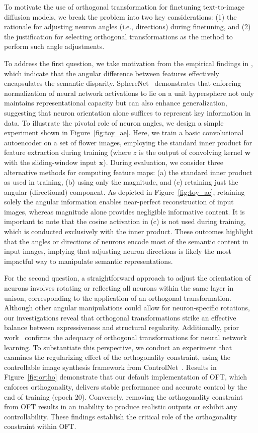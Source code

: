 To motivate the use of orthogonal transformation for finetuning text-to-image diffusion models, we break the problem into two key considerations: (1) the rationale for adjusting neuron angles (i.e., directions) during finetuning, and (2) the justification for selecting orthogonal transformations as the method to perform such angle adjustments.

To address the first question, we take motivation from the empirical findings in \cite{liu2018decoupled,chen2020angular}, which indicate that the angular difference between features effectively encapsulates the semantic disparity. SphereNet~\cite{liu2017deep} demonstrates that enforcing normalization of neural network activations to lie on a unit hypersphere not only maintains representational capacity but can also enhance generalization, suggesting that neuron orientation alone suffices to represent key information in data. To illustrate the pivotal role of neuron angles, we design a simple experiment shown in Figure~\ref{fig:toy_ae}. Here, we train a basic convolutional autoencoder on a set of flower images, employing the standard inner product for feature extraction during training (where $z$ is the output of convolving kernel $\bm{w}$ with the sliding-window input $\bm{x}$). During evaluation, we consider three alternative methods for computing feature maps: (a) the standard inner product as used in training, (b) using only the magnitude, and (c) retaining just the angular (directional) component. As depicted in Figure~\ref{fig:toy_ae}, retaining solely the angular information enables near-perfect reconstruction of input images, whereas magnitude alone provides negligible informative content. It is important to note that the cosine activation in (c) is not used during training, which is conducted exclusively with the inner product. These outcomes highlight that the angles or directions of neurons encode most of the semantic content in input images, implying that adjusting neuron directions is likely the most impactful way to manipulate semantic representations.

For the second question, a straightforward approach to adjust the orientation of neurons involves rotating or reflecting all neurons within the same layer in unison, corresponding to the application of an orthogonal transformation. Although other angular manipulations could allow for neuron-specific rotations, our investigations reveal that orthogonal transformations strike an effective balance between expressiveness and structural regularity. Additionally, prior work~\cite{liu2021orthogonal} confirms the adequacy of orthogonal transformations for neural network learning. To substantiate this perspective, we conduct an experiment that examines the regularizing effect of the orthogonality constraint, using the controllable image synthesis framework from ControlNet~\cite{zhang2023adding}. Results in Figure~\ref{fig:ortho} demonstrate that our default implementation of OFT, which enforces orthogonality, delivers stable performance and accurate control by the end of training (epoch 20). Conversely, removing the orthogonality constraint from OFT results in an inability to produce realistic outputs or exhibit any controllability. These findings establish the critical role of the orthogonality constraint within OFT.

